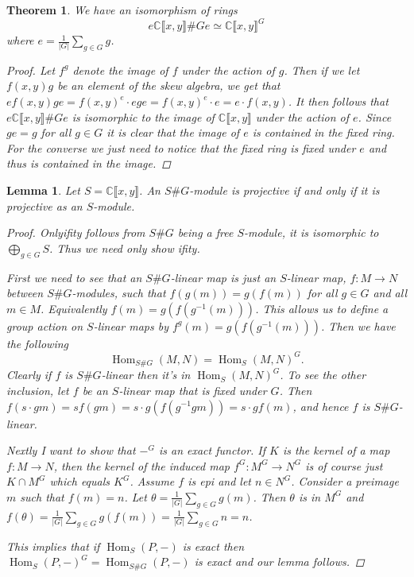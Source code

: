 \documentclass[11pt, a4paper, english]{article}
\numberwithin{prop}{section}
\newtheorem{lemma}{Lemma}
\numberwithin{lemma}{section}
\newtheorem{theorem}{Theorem}
\numberwithin{theorem}{section}
\numberwithin{defin}{section}
\numberwithin{example}{section}
\newcommand{\C}{\mathbb{C}}
\DeclareMathOperator{\Hom}{Hom}
\begin{document}
\begin{theorem}
We have an isomorphism of rings
$$ e \C\llbracket x, y \rrbracket \# G e \simeq \C\llbracket x, y \rrbracket^G $$
where $e = \frac{1}{|G|} \sum_{g \in G} g$.

\begin{proof}
Let $f^g$ denote the image of $f$ under the action of $g$. Then if we let $f(x,y)g$ be an element of the skew algebra, we get that $e f(x,y)g e = f(x, y)^e \cdot ege = f(x, y)^e \cdot e = e \cdot f(x, y)$. It then follows that $  e \C\llbracket x, y\rrbracket \# G e$ is isomorphic to the image of $\C\llbracket x, y \rrbracket$ under the action of $e$. Since $ge=g$ for all $g\in G$ it is clear that the image of $e$ is contained in the fixed ring. For the converse we just need to notice that the fixed ring is fixed under $e$ and thus is contained in the image.
\end{proof}
\end{theorem}

\begin{lemma}
\label{lem:S proj => SG proj}
Let $S = \C\llbracket x, y \rrbracket$. An $S\#G$-module is projective if and only if it is projective as an $S$-module.

\begin{proof}
Onlyifity follows from $S\#G$ being a free $S$-module, it is isomorphic to $\bigoplus_{g \in G} S$. Thus we need only show ifity.

First we need to see that an $S\#G$-linear map is just an $S$-linear map, $f: M \to N$ between $S\#G$-modules, such that $f(g(m))=g(f(m))$ for all $g \in G$ and all $m \in M$. Equivalently $f(m) = g(f(g^{-1}(m)))$. This allows us to define a group action on $S$-linear maps by $f^g(m) = g(f(g^{-1}(m)))$. Then we have the following $$ \Hom_{S\#G}(M,N) = \Hom_S(M,N)^G.$$
Clearly if $f$ is $S\#G$-linear then it's in $\Hom_S(M,N)^G$. To see the other inclusion, let $f$ be an $S$-linear map that is fixed under $G$. Then $f(s\cdot g m) = s f(g m) = s\cdot g(f(g^{-1} g m)) = s \cdot g f(m) $, and hence $f$ is $S\#G$-linear. 

Nextly I want to show that $-^G$ is an exact functor. If $K$ is the kernel of a map $f: M \to N$, then the kernel of the induced map $f^G : M^G \to N^G$ is of course just $K \cap M^G$ which equals $K^G$. Assume $f$ is epi and let $n \in N^G$. Consider a preimage $m$ such that $f(m)=n$. Let $\theta = \frac{1}{|G|}\sum_{g \in G} g(m)$. Then $\theta$ is in $M^G$ and $f(\theta) = \frac{1}{|G|}\sum_{g \in G} g(f(m)) = \frac{1}{|G|}\sum_{g \in G} n = n$.

This implies that if $\Hom_S(P, -)$ is exact then $\Hom_S(P, -)^G = \Hom_{S\#G}(P, -)$ is exact and our lemma follows.
\end{proof}
\end{lemma}
\end{document}
